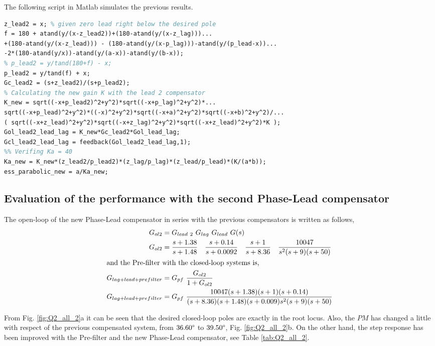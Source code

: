 \documentclass[11pt, a4paper]{article}
\begin{document}
The following script in Matlab simulates the previous results.
\begin{lstlisting}[language=tex, caption={}, label={}]
%% New phase-lead compensator
z_lead2 = x; % given zero lead right below the desired pole
f = 180 + atand(y/(x-z_lead2))+(180-atand(y/(x-z_lag)))...
+(180-atand(y/(x-z_lead))) - (180-atand(y/(x-p_lag)))-atand(y/(p_lead-x))...
-2*(180-atand(y/x))-atand(y/(a-x))-atand(y/(b-x));
% p_lead2 = y/tand(180+f) - x;
p_lead2 = y/tand(f) + x;
Gc_lead2 = (s+z_lead2)/(s+p_lead2);
% Calculating the new gain K with the lead 2 compensator
K_new = sqrt((-x+p_lead2)^2+y^2)*sqrt((-x+p_lag)^2+y^2)*...
sqrt((-x+p_lead)^2+y^2)*((-x)^2+y^2)*sqrt((-x+a)^2+y^2)*sqrt((-x+b)^2+y^2)/...
( sqrt((-x+z_lead)^2+y^2)*sqrt((-x+z_lag)^2+y^2)*sqrt((-x+z_lead)^2+y^2)*K );
Gol_lead2_lead_lag = K_new*Gc_lead2*Gol_lead_lag;
Gcl_lead2_lead_lag = feedback(Gol_lead2_lead_lag,1);
%% Verifing Ka = 40 
Ka_new = K_new*(z_lead2/p_lead2)*(z_lag/p_lag)*(z_lead/p_lead)*(K/(a*b));
ess_parabolic_new = a/Ka_new; 
\end{lstlisting}


\subsection{Evaluation of the performance with the second Phase-Lead compensator}
The open-loop of the new Phase-Lead compensator in series with the previous compensators is written as follows,
\begin{align}
G_{ol2} &= G_{lead~2}~G_{lag}~G_{lead} ~G(s) \label{eq:Gol_lead_lag_lead2}\\ 
G_{ol2} &= \dfrac{s+1.38}{s+1.48}\quad \dfrac{s+0.14}{s+0.0092} \quad \dfrac{s+1}{s+8.36} \quad \dfrac{10047}{s^2(s+9)(s+50)}  \nonumber\\
\intertext{and the Pre-filter with the closed-loop systems is,}
G_{lag+lead+prefilter} &= G_{pf}~ \dfrac{G_{ol2}}{1+G_{ol2}} \\
G_{lag+lead+prefilter} &= G_{pf}~ \dfrac{10047(s+1.38)(s+1)(s+0.14)}{(s+8.36)(s+1.48)(s+0.009)s^2(s+9)(s+50)} \nonumber
\end{align}

From Fig. \ref{fig:Q2_all_2}a it can be seen that the desired closed-loop poles are exactly in the root locus. Also, the $PM$ has changed a little with respect of the previous compensated system, from $36.60\degree$ to $39.50\degree$, Fig. \ref{fig:Q2_all_2}b. On the other hand, the step response has been improved with the Pre-filter and the new Phase-Lead compensator, see Table \ref{tab:Q2_all_2}.
\end{document}
